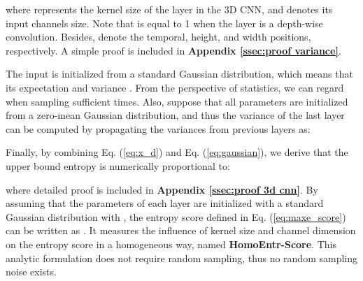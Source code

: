 \documentclass{article} \usepackage{iclr2023_conference,times}
\begin{document}
where  represents the kernel size of the  layer in the 3D CNN, and  denotes its input channels size. Note that  is equal to 1 when the layer is a depth-wise convolution.
Besides,  denote the temporal, height, and width positions, respectively.
A simple proof is included in \textbf{Appendix \ref{ssec:proof variance}}.








The input  is initialized from a standard Gaussian distribution, which means that its expectation  and variance .
From the perspective of statistics, we can regard  when sampling sufficient times.
Also, suppose that all parameters are initialized from a zero-mean Gaussian distribution, and thus the variance of the last layer  can be computed by propagating the variances from previous layers as:

Finally, by combining Eq. (\ref{eq:x_d}) and Eq. (\ref{eq:gaussian}), we derive that the upper bound entropy is numerically proportional to:

where detailed proof is included in \textbf{Appendix \ref{ssec:proof 3d cnn}}. 
By assuming that the parameters of each layer are initialized with a standard Gaussian distribution with , the entropy score defined in Eq. (\ref{eq:maxe_score}) can be written as  . It measures the influence of kernel size and channel dimension on the entropy score in a homogeneous way, named \textbf{HomoEntr-Score}. 
This analytic formulation does not require random sampling, thus no random sampling noise exists.
\end{document}

